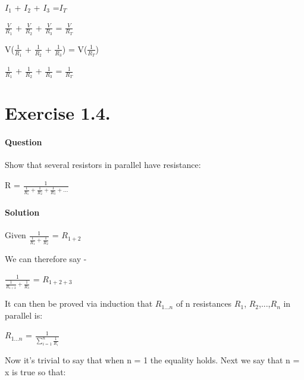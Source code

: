 \documentclass[a4paper, 12pt]{article}
\begin{document}
$I_1$ + $I_2$ + $I_3$ =$I_T$\newline

$\frac{V}{R_1}$ + $\frac{V}{R_2}$ + $\frac{V}{R_3}$ = $\frac{V}{R_T}$\newline

V($\frac{1}{R_1}$ + $\frac{1}{R_2}$ + $\frac{1}{R_3}$) = V($\frac{1}{R_T}$)\newline

$\frac{1}{R_1}$ + $\frac{1}{R_2}$ + $\frac{1}{R_3}$ = $\frac{1}{R_T}$\newline

\clearpage

\section{Exercise 1.4.}

\paragraph{Question\newline}

Show that several resistors in parallel have resistance:\newline

R = $\frac{1}{\frac{1}{R_1} + \frac{1}{R_2} + \frac{1}{R_3} + ...}$\newline

\paragraph{Solution\newline}

Given $\frac{1}{\frac{1}{R_1} + \frac{1}{R_2}}$ = $R_{1+2}$\newline

We can therefore say -\newline


$\frac{1}{\frac{1}{R_{1+2}} + \frac{1}{R_3}}$ = $R_{1+2+3}$\newline

It can then be proved via induction that $R_{1...n}$ of n resistances $R_1$, $R_2$,...,$R_n$ in parallel is:\newline

$R_{1...n}$ = $\frac{1}{\sum^{n}_{i=1} \frac{1}{R_i}}$\newline

Now it's trivial to say that when n = 1 the equality holds. Next we say that n = x is true so that:\newline
\end{document}
